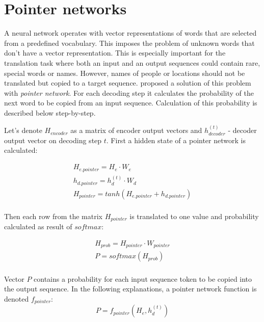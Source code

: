 \section{Pointer networks} \label{pointer}
A neural network operates with vector representations of words that are selected from a predefined vocabulary. This imposes the problem of unknown words that don't have a vector representation. This is especially important for the translation task where both an input and an output sequences could contain rare, special words or names. However, names of people or locations should not be translated but copied to a target sequence. \cite{Vinyals2015} proposed a solution of this problem with \emph{pointer network}. For each decoding step it calculates the probability of the next word to be copied from an input sequence. Calculation of this probability is described below step-by-step.

Let's denote $H_{encoder}$ as a matrix of encoder output vectors and $h_{decoder}^{(t)}$ - decoder output vector on decoding step $t$. First a hidden state of a pointer network is calculated:

\begin{equation}
    \begin{gathered}
    
    H_{e.pointer} = H_e \cdot W_{e}\\
    
    h_{d.pointer} = h_{d}^{(t)} \cdot W_{d}\\
    
    H_{pointer} = tanh(H_{e.pointer} + h_{d.pointer})\\
    
    \end{gathered}
    \label{eq:pointer}
\end{equation}

Then each row from the matrix $H_{pointer}$ is translated to one value and probability calculated as result of $softmax$:

\begin{equation}
    \begin{gathered}
    
    H_{prob} = H_{pointer} \cdot W_{pointer}\\
    
    P = softmax(H_{prob})\\
    
    \end{gathered}
\end{equation}

Vector $P$ contains a probability for each input sequence token to be copied into the output sequence. In the following explanations, a pointer network function is denoted $f_{pointer}$:
\begin{equation}
    P = f_{pointer}(H_e, h_d^{(t)})
\end{equation}